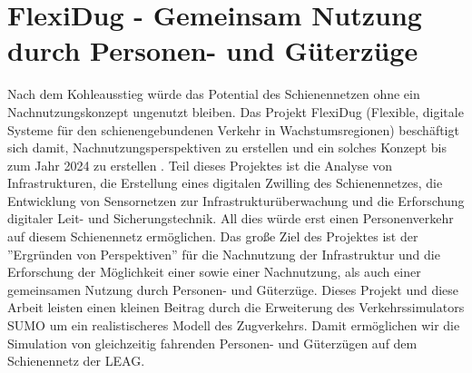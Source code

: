 \section{FlexiDug - Gemeinsam Nutzung durch Personen- und Güterzüge}

Nach dem Kohleausstieg würde das Potential des Schienennetzen ohne ein Nachnutzungskonzept ungenutzt bleiben\cite{rbb_hpi_2022}. Das Projekt FlexiDug (Flexible, digitale Systeme für den schienengebundenen Verkehr in Wachstumsregionen) beschäftigt sich damit, Nachnutzungsperspektiven zu erstellen und ein solches Konzept bis zum Jahr 2024 zu erstellen \cite{hasso_plattner_institut_flexidug_2022}. Teil dieses Projektes ist die Analyse von Infrastrukturen, die Erstellung eines digitalen Zwilling des Schienennetzes, die Entwicklung von Sensornetzen zur Infrastrukturüberwachung und die Erforschung digitaler Leit- und Sicherungstechnik. All dies würde erst einen Personenverkehr auf diesem Schienennetz ermöglichen\cite{rbb_hpi_2022}. Das große Ziel des Projektes ist der ''Ergründen von Perspektiven''\cite{rbb_hpi_2022} für die Nachnutzung der Infrastruktur und die Erforschung der Möglichkeit einer sowie einer Nachnutzung, als auch einer gemeinsamen Nutzung durch Personen- und Güterzüge. Dieses Projekt und diese Arbeit leisten einen kleinen Beitrag durch die Erweiterung des Verkehrssimulators SUMO um ein realistischeres Modell des Zugverkehrs. Damit ermöglichen wir die Simulation von gleichzeitig fahrenden Personen- und Güterzügen auf dem Schienennetz der LEAG.
